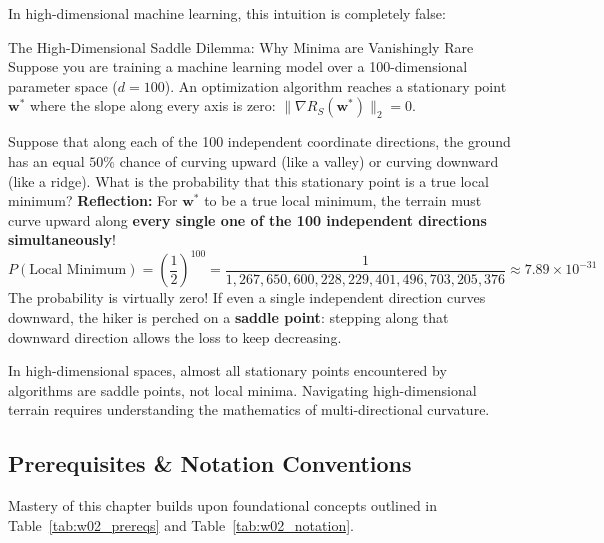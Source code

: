 In high-dimensional machine learning, this intuition is completely false:

\begin{ponderbox}{The High-Dimensional Saddle Dilemma: Why Minima are Vanishingly Rare}
Suppose you are training a machine learning model over a 100-dimensional parameter space ($d = 100$). An optimization algorithm reaches a stationary point $\mathbf{w}^*$ where the slope along every axis is zero: $\|\nabla R_S(\mathbf{w}^*)\|_2 = 0$.

Suppose that along each of the 100 independent coordinate directions, the ground has an equal $50\%$ chance of curving upward (like a valley) or curving downward (like a ridge). What is the probability that this stationary point is a true local minimum?
\tcblower
\textbf{Reflection:} For $\mathbf{w}^*$ to be a true local minimum, the terrain must curve upward along \textbf{every single one of the 100 independent directions simultaneously}!
\begin{equation}
P(\text{Local Minimum}) = \left(\frac{1}{2}\right)^{100} = \frac{1}{1{,}267{,}650{,}600{,}228{,}229{,}401{,}496{,}703{,}205{,}376} \approx 7.89 \times 10^{-31}
\end{equation}
The probability is virtually zero! If even a single independent direction curves downward, the hiker is perched on a \textbf{saddle point}: stepping along that downward direction allows the loss to keep decreasing. 

In high-dimensional spaces, almost all stationary points encountered by algorithms are saddle points, not local minima. Navigating high-dimensional terrain requires understanding the mathematics of multi-directional curvature.
\end{ponderbox}

\subsection{Prerequisites \& Notation Conventions}
Mastery of this chapter builds upon foundational concepts outlined in Table~\ref{tab:w02_prereqs} and Table~\ref{tab:w02_notation}.

